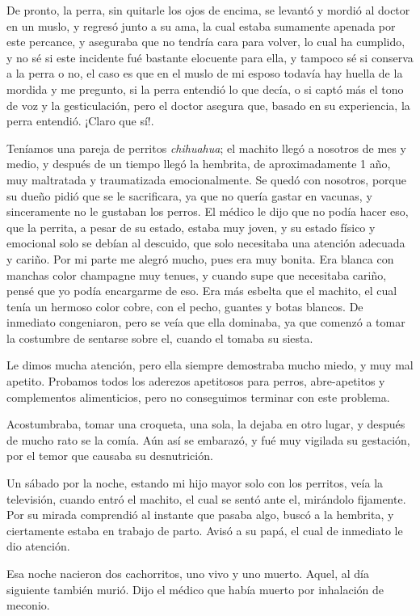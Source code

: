 \documentclass[letterpaper, 12pt]{book}
\begin{document}
De pronto, la perra, sin quitarle los ojos de encima, se levantó y mordió al doctor en un muslo, y regresó junto a su ama, la cual estaba sumamente apenada por este percance, y aseguraba que no tendría cara para volver, lo cual ha cumplido, y no sé si este incidente fué bastante elocuente para ella, y tampoco sé si conserva a la perra o no, el caso es que en el muslo de mi esposo todavía hay huella de la mordida y me pregunto, si la perra entendió lo que decía, o si captó más el tono de voz y la gesticulación, pero el doctor asegura que, basado en su experiencia, la perra entendió. ¡Claro que sí!.

Teníamos una pareja de perritos \textit{chihuahua}; el machito llegó a nosotros de mes y medio, y después de un tiempo llegó la hembrita, de aproximadamente 1 año, muy maltratada y traumatizada emocionalmente. Se quedó con nosotros, porque su dueño pidió que se le sacrificara, ya que no quería gastar en vacunas, y sinceramente no le gustaban los perros. El médico le dijo que no podía hacer eso, que la perrita, a pesar de su estado, estaba muy joven, y su estado físico y emocional solo se debían al descuido, que solo necesitaba una atención adecuada y cariño. Por mi parte me alegró mucho, pues era muy bonita. Era blanca con manchas color champagne muy tenues, y cuando supe que necesitaba cariño, pensé que yo podía encargarme de eso. Era más esbelta que el machito, el cual tenía un hermoso color cobre, con el pecho, guantes y botas blancos. De inmediato congeniaron, pero se veía que ella dominaba, ya que comenzó a tomar la costumbre de sentarse sobre el, cuando el tomaba su siesta. 

Le dimos mucha atención, pero ella siempre demostraba mucho miedo, y muy mal apetito. Probamos todos los aderezos apetitosos para perros, abre-apetitos y complementos alimenticios, pero no conseguimos terminar con este problema. 

Acostumbraba, tomar una croqueta, una sola, la dejaba en otro lugar, y después de mucho rato se la comía. Aún así se embarazó, y fué muy vigilada su gestación, por el temor que causaba su desnutrición.

Un sábado por la noche, estando mi hijo mayor solo con los perritos, veía la televisión, cuando entró el machito, el cual se sentó ante el, mirándolo fijamente. Por su mirada comprendió al instante que pasaba algo, buscó a la hembrita, y ciertamente estaba en trabajo de parto. Avisó a su papá, el cual de inmediato le dio atención. 

Esa noche nacieron dos cachorritos, uno vivo y uno muerto. Aquel, al día siguiente también murió. Dijo el médico que había muerto por inhalación de meconio. 
\end{document}
